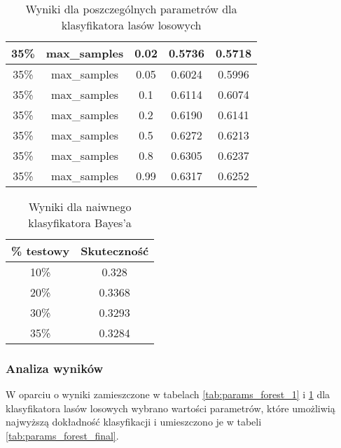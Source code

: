 \documentclass{classrep}
\begin{document}
{{{\begin{table}[!htbp]
\begin{tabular}{|c|c|c|c|c|}
35\% & max\_samples & 0.02 & 0.5736 & 0.5718 \\ \hline
35\% & max\_samples & 0.05 & 0.6024 & 0.5996 \\ \hline
35\% & max\_samples & 0.1 & 0.6114 & 0.6074 \\ \hline
35\% & max\_samples & 0.2 & 0.6190 & 0.6141 \\ \hline
35\% & max\_samples & 0.5 & 0.6272 & 0.6213 \\ \hline
35\% & max\_samples & 0.8 & 0.6305 & 0.6237 \\ \hline
35\% & max\_samples & 0.99 & 0.6317 & 0.6252 \\ \hline

                \end{tabular}
                \caption{Wyniki dla poszczególnych parametrów dla klasyfikatora lasów losowych}
                \label{tab:params_forest_2}
            \end{table}
            \FloatBarrier
            }
            \begin{table}[!htbp]
                \begin{tabular}{|c|c|}
                    \hline
                    \% testowy & Skuteczność \\ \hline
                    10\% & 0.328 \\ \hline
20\% & 0.3368 \\ \hline
30\% & 0.3293 \\ \hline
35\% & 0.3284 \\ \hline
                \end{tabular}
                \caption{Wyniki dla naiwnego klasyfikatora Bayes'a}
                \label{tab:params_bayes}
            \end{table}
            \FloatBarrier
                        \subsubsection{Analiza wyników} {

            W oparciu o wyniki zamieszczone w tabelach \ref{tab:params_forest_1} i \ref{tab:params_forest_2} dla klasyfikatora lasów losowych wybrano wartości parametrów, które umożliwią najwyższą dokładność klasyfikacji i umieszczono je w tabeli \ref{tab:params_forest_final}. 
            
}}}
\end{document}
